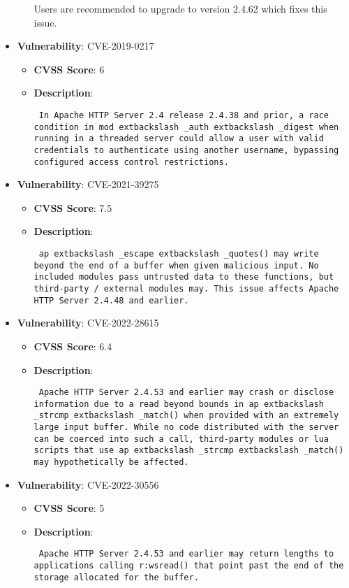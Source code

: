 \documentclass{article}
\begin{document}
\begin{itemize}
\begin{itemize}
{{Users are recommended to upgrade to version 2.4.62 which fixes this issue.  }}
        \end{itemize}
    
        \item \textbf{Vulnerability}: CVE-2019-0217
        \begin{itemize}
            \item \textbf{CVSS Score}:  6 
            \item \textbf{Description}: \parbox{\linewidth}{\texttt{ In Apache HTTP Server 2.4 release 2.4.38 and prior, a race condition in mod	extbackslash _auth	extbackslash _digest when running in a threaded server could allow a user with valid credentials to authenticate using another username, bypassing configured access control restrictions. }}
        \end{itemize}
    
        \item \textbf{Vulnerability}: CVE-2021-39275
        \begin{itemize}
            \item \textbf{CVSS Score}:  7.5 
            \item \textbf{Description}: \parbox{\linewidth}{\texttt{ ap	extbackslash _escape	extbackslash _quotes() may write beyond the end of a buffer when given malicious input. No included modules pass untrusted data to these functions, but third-party / external modules may. This issue affects Apache HTTP Server 2.4.48 and earlier. }}
        \end{itemize}
    
        \item \textbf{Vulnerability}: CVE-2022-28615
        \begin{itemize}
            \item \textbf{CVSS Score}:  6.4 
            \item \textbf{Description}: \parbox{\linewidth}{\texttt{ Apache HTTP Server 2.4.53 and earlier may crash or disclose information due to a read beyond bounds in ap	extbackslash _strcmp	extbackslash _match() when provided with an extremely large input buffer. While no code distributed with the server can be coerced into such a call, third-party modules or lua scripts that use ap	extbackslash _strcmp	extbackslash _match() may hypothetically be affected. }}
        \end{itemize}
    
        \item \textbf{Vulnerability}: CVE-2022-30556
        \begin{itemize}
            \item \textbf{CVSS Score}:  5 
            \item \textbf{Description}: \parbox{\linewidth}{\texttt{ Apache HTTP Server 2.4.53 and earlier may return lengths to applications calling r:wsread() that point past the end of the storage allocated for the buffer. }}
        \end{itemize}
    

\end{itemize}
\end{document}
